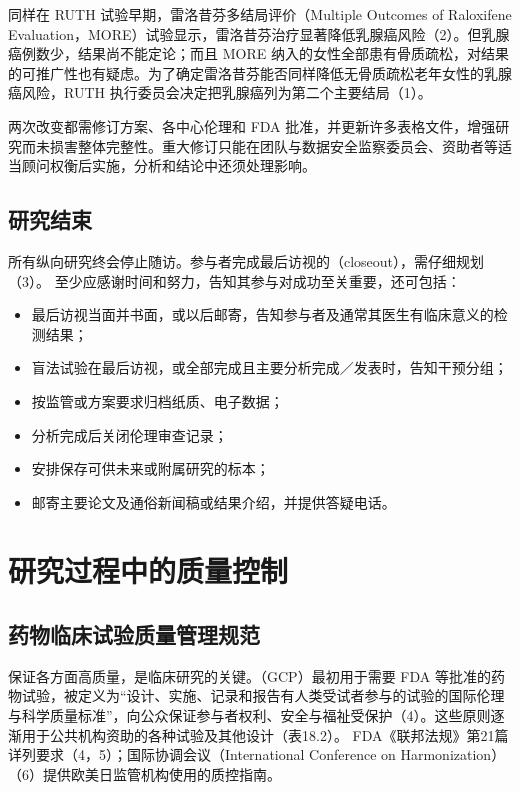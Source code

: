 同样在 RUTH 试验早期，雷洛昔芬多结局评价（Multiple Outcomes of Raloxifene Evaluation，MORE）试验显示，雷洛昔芬治疗显著降低乳腺癌风险（2）。但乳腺癌例数少，结果尚不能定论；而且 MORE 纳入的女性全部患有骨质疏松，对结果的可推广性也有疑虑。为了确定雷洛昔芬能否同样降低无骨质疏松老年女性的乳腺癌风险，RUTH 执行委员会决定把乳腺癌列为第二个主要结局（1）。

两次改变都需修订方案、各中心伦理和 FDA 批准，并更新许多表格文件，增强研究而未损害整体完整性。重大修订只能在团队与数据安全监察委员会、资助者等适当顾问权衡后实施，分析和结论中还须处理影响。

\subsection{研究结束}
所有纵向研究终会停止随访。参与者完成最后访视的（closeout），需仔细规划（3）。
至少应感谢时间和努力，告知其参与对成功至关重要，还可包括：
\begin{itemize}
\item 最后访视当面并书面，或以后邮寄，告知参与者及通常其医生有临床意义的检测结果；
\item 盲法试验在最后访视，或全部完成且主要分析完成／发表时，告知干预分组；
\item 按监管或方案要求归档纸质、电子数据；
\item 分析完成后关闭伦理审查记录；
\item 安排保存可供未来或附属研究的标本；
\item 邮寄主要论文及通俗新闻稿或结果介绍，并提供答疑电话。
\end{itemize}

\section{研究过程中的质量控制}
\subsection{药物临床试验质量管理规范}
保证各方面高质量，是临床研究的关键。（GCP）最初用于需要 FDA 等批准的药物试验，被定义为“设计、实施、记录和报告有人类受试者参与的试验的国际伦理与科学质量标准”，向公众保证参与者权利、安全与福祉受保护（4）。这些原则逐渐用于公共机构资助的各种试验及其他设计（表18.2）。
FDA《联邦法规》第21篇详列要求（4，5）；国际协调会议（International Conference on Harmonization）（6）提供欧美日监管机构使用的质控指南。

